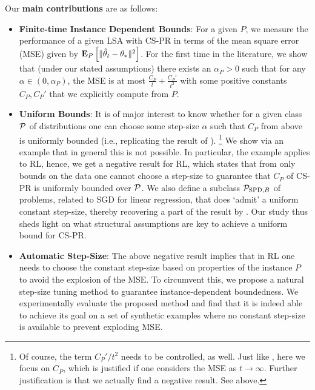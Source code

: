 Our \textbf{main contributions} are as follows:
\begin{itemize}[leftmargin=*]%
\item \textbf{Finite-time Instance Dependent Bounds}: For a given $P$, we  measure the performance of a given LSA with CS-PR in terms of the mean square error (MSE) given by $\EEP{\normsm{\thh_t-\ts}^2}$. 
For the first time in the literature,
we show that (under our stated assumptions) there exists an $\alpha_P>0$ such that 
for any $\alpha\in (0,\alpha_P)$,
the MSE %
is at most $\frac{C_P}{t}+\frac{C_P'}{t^2}$ with some positive constants $C_P,C_P'$ that we explicitly compute from $P$.
\item \textbf{Uniform Bounds}:
It is of major interest to know whether for a given class $\P$ of distributions 
one can choose some step-size $\alpha$ 
such that $C_P$ from above is uniformly bounded (i.e., replicating the result of \citet{bach}).%
\footnote{Of course, the term $C_P'/t^2$ needs to be controlled, as well. Just like \citet{bach}, here we focus on $C_P$, which is justified if one considers the MSE as $t\to\infty$. Further justification is that we actually find a negative result. See above.}
We show via an example that in general this is not possible.
In particular, the example applies to RL, hence, we get a negative result for RL, which states that from only bounds on the data one cannot choose a step-size to guarantee that $C_P$ of CS-PR is uniformly bounded over $\P$.
We also define a subclass  $\P_{\text{SPD},B}$ of problems, related to SGD for linear regression, that does `admit' a uniform constant step-size, thereby recovering a part of the result by \citet{bach}.  Our study thus sheds light on what structural assumptions are key to achieve a uniform bound for CS-PR.
\item \textbf{Automatic Step-Size}: 
The above negative result implies that in RL one needs to choose the constant step-size based on properties of the instance $P$ to avoid the explosion of the MSE.
To circumvent this, we propose a natural step-size tuning method to guarantee instance-dependent boundedness.
We experimentally evaluate the proposed method and find that it is indeed able to achieve its goal on a set of synthetic examples
where no constant step-size is available to prevent exploding MSE.
\end{itemize}
